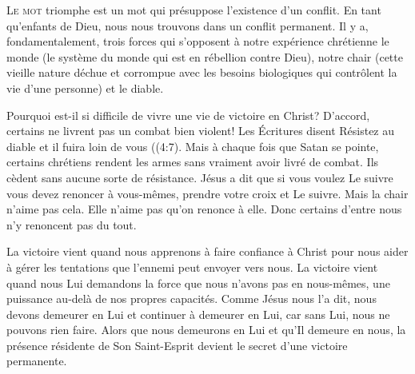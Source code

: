 


\lettrine{L}{e mot} \Og triomphe \Fg{}
 est un mot qui présuppose l'existence d'un conflit.
 En tant qu'enfants de Dieu,
 nous nous trouvons dans un conflit permanent.
 Il y a, fondamentalement, trois forces qui s'opposent
 à notre expérience chrétienne\frcolon{} le monde
 (le système du monde qui est en rébellion contre Dieu),
 notre chair (cette vieille nature déchue et corrompue
 avec les besoins biologiques qui contrôlent
 la vie d'une personne) et le diable.


Pourquoi est-il si difficile de vivre une vie de victoire en Christ?
 D'accord, certains ne livrent pas un combat bien violent!
 Les Écritures disent\frcolon{} 
 \Og Résistez au diable et il fuira loin de vous \Fg{}
 ((4:7).
 Mais à chaque fois que Satan se pointe, certains chrétiens rendent
 les armes sans vraiment avoir livré de combat.
 Ils cèdent sans aucune sorte de résistance.
 Jésus a dit que si vous voulez Le suivre vous devez renoncer à vous-mêmes,
 prendre votre croix et Le suivre.
 Mais la chair n'aime pas cela. Elle n'aime pas qu'on renonce à elle.
 Donc certains d'entre nous n'y renoncent pas du tout.

La victoire vient quand nous apprenons à faire confiance à Christ
 pour nous aider à gérer les tentations que l'ennemi peut envoyer vers nous.
 La victoire vient quand nous Lui demandons la force
 que nous n'avons pas en nous-mêmes, une puissance au-delà
 de nos propres capacités.
 Comme Jésus nous l'a dit, nous devons demeurer en Lui
 et continuer à demeurer en Lui, car sans Lui, nous ne pouvons rien faire.
 Alors que nous demeurons en Lui et qu'Il demeure en nous,
 la présence résidente de Son Saint-Esprit
 devient le secret d'une victoire permanente.

\dvrule





